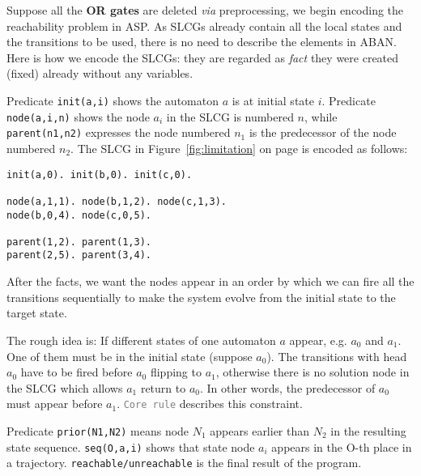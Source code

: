 Suppose all the \textbf{OR gates} are deleted \textit{via} preprocessing, we begin encoding the reachability problem in ASP.
As SLCGs already contain all the local states and the transitions to be used, there is no need to describe the elements in ABAN.
Here is how we encode the SLCGs: they are regarded as \textit{fact} they were created (fixed) already without any variables.

Predicate \texttt{init(a,i)} shows the automaton $a$ is at initial state $i$. %
Predicate \texttt{node(a,i,n)} shows the node $a_i$ in the SLCG is numbered $n$, while \texttt{parent(n1,n2)} expresses the node numbered $n_1$ is the predecessor of the node numbered $n_2$.
The SLCG in Figure~\ref{fig:limitation} on page \pageref{fig:limitation} is encoded as follows:
\begin{Verbatim}[commandchars=\\\{\}]
init(a,0). init(b,0). init(c,0).

node(a,1,1). node(b,1,2). node(c,1,3).
node(b,0,4). node(c,0,5).

parent(1,2). parent(1,3).
parent(2,5). parent(3,4).
\end{Verbatim}
After the facts, we want the nodes appear in an order by which we can fire all the transitions sequentially to make the system evolve from the initial state to the target state. 

The rough idea is: If different states of one automaton $a$ appear, e.g. $a_0$ and $a_1$.
One of them must be in the initial state (suppose $a_0$).
The transitions with head $a_0$ have to be fired before $a_0$ flipping to $a_1$, otherwise there is no solution node in the SLCG which allows $a_1$ return to $a_0$.
In other words, the predecessor of $a_0$ must appear before $a_1$. \texttt{\textcolor{gray}{Core rule}} describes this constraint.

Predicate \texttt{prior(N1,N2)} means node $N_1$ appears earlier than $N_2$ in the resulting state sequence.
\texttt{seq(O,a,i)} shows that state node $a_i$ appears in the O-th place in a trajectory.
\texttt{reachable/unreachable} is the final result of the program.

